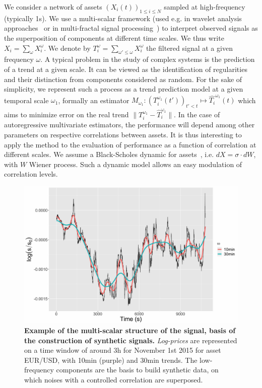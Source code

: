 \documentclass{article}
\newcommand{\norm}[1]{\| #1 \|}
\begin{document}
We consider a network of assets $(X_i(t))_{1\leq i \leq N}$ sampled at high-frequency (typically 1s). We use a multi-scalar framework (used e.g. in wavelet analysis approaches~\cite{ramsey2002wavelets} or in multi-fractal signal processing~\cite{bouchaud2000apparent}) to interpret observed signals as the superposition of components at different time scales. We thus write $X_i=\sum_{\omega}{X_i^{\omega}}$. We denote by $T_i^{\omega} = \sum_{\omega' \leq \omega} X_i^{\omega}$ the filtered signal at a given frequency $\omega$. A typical problem in the study of complex systems is the prediction of a trend at a given scale. It can be viewed as the identification of regularities and their distinction from components considered as random. For the sake of simplicity, we represent such a process as a trend prediction model at a given temporal scale $\omega_1$, formally an estimator $M_{\omega_1} : (T_i^{\omega_1}(t'))_{t'<t} \mapsto \hat{T_i}^{\omega_1}(t)$ which aims to minimize error on the real trend $\norm{T_i^{\omega_1} - \hat{T}_i^{\omega_1}}$. In the case of autoregressive multivariate estimators, the performance will depend among other parameters on respective correlations between assets. It is thus interesting to apply the method to the evaluation of performance as a function of correlation at different scales. We assume a Black-Scholes dynamic for assets~\cite{jarrow1999honor}, i.e. $dX = \sigma\cdot dW$, with $W$ Wiener process. Such a dynamic model allows an easy modulation of correlation levels.


      
\begin{figure}%
\includegraphics[width=\columnwidth]{Fig3.jpg}
\caption{\textbf{Example of the multi-scalar structure of the signal, basis of the construction of synthetic signals.} \emph{Log-prices} are represented on a time window of around 3h for November 1st 2015 for asset EUR/USD, with 10min (purple) and 30min trends. The low-frequency components are the basis to build synthetic data, on which noises with a controlled correlation are superposed.\label{fig:example_signal}}
\end{figure}
\end{document}
